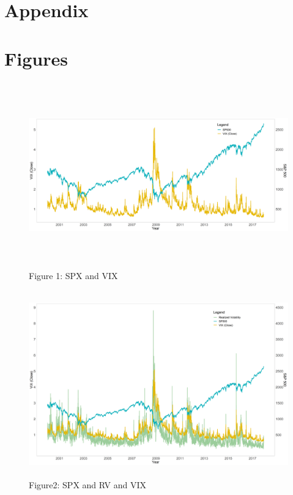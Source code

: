 \section{Appendix}
\appendix
\section*{Figures}
%
\begin{figure}[!htbp]\label{fig1}\caption{Figure 1: \ac{SPX} and VIX}
\includegraphics[width=16cm, height=8cm]{pictures/SPandViX.png}
\end{figure}
%
\begin{figure}[!htbp]\label{fig2}\caption{Figure2: \ac{SPX} and RV and VIX}
\includegraphics[width=16cm, height=8cm]{pictures/SPandVolandViX.png}
\end{figure}

\newpage
